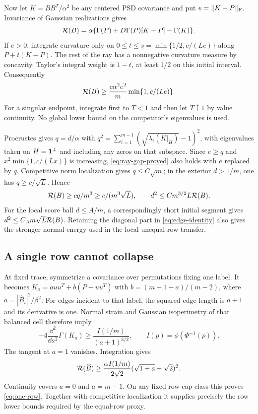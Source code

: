 Now let $K=BB^T/\alpha^2$ be any centered PSD covariance and put
$e=\|K-P\|_\mathrm F$. Invariance of Gaussian realizations gives
\[
 \mathcal R(B)=\alpha\{\Gamma(P)+D\Gamma(P)[K-P]-\Gamma(K)\}.
\]
If $e>0$, integrate curvature only on
$0\le t\le s=\min\{1/2,c/(Le)\}$ along $P+t(K-P)$.
The rest of the ray has a nonnegative curvature measure by concavity.
Taylor's integral weight is $1-t$, at least $1/2$ on this initial interval.
Consequently
\begin{equation}\label{eq:ray-gap-proved}
 \mathcal R(B)\ge\frac{c\alpha^2e^2}{m}
                      \min\{1,c/(Le)\}.
\end{equation}
For a singular endpoint, integrate first to $T<1$ and then let
$T\uparrow1$ by value continuity. No global lower bound on the
competitor's eigenvalues is used.

Procrustes gives $q=d/\alpha$ with
$q^2=\sum_{i=1}^{m-1}(\sqrt{\lambda_i(K|_H)}-1)^2$, with eigenvalues
taken on $H=\mathbf 1^\perp$ and including any zeros on that subspace.
Since $e\ge q$ and $x^2\min\{1,c/(Lx)\}$ is increasing,
\eqref{eq:ray-gap-proved} also holds with $e$ replaced by $q$.
Competitive norm localization gives $q\le C\sqrt m$; in the exterior
$d>1/m$, one has $q\ge c/\sqrt L$. Hence
\begin{equation}\label{eq:ray-exterior-proved}
 \mathcal R(B)\ge cq/m^3\ge c/(m^3\sqrt L),\qquad
 d^2\le Cm^{3/2}L\mathcal R(B).
\end{equation}
For the local score ball $d\le A/m$, a correspondingly short initial
segment gives $d^2\le C_A m\sqrt L\mathcal R(B)$. Retaining the diagonal
part in \eqref{eq:edge-identity} also gives the stronger normal energy
used in the local unequal-row transfer.

\subsection{A single row cannot collapse}
At fixed trace, symmetrize a covariance over permutations fixing one label.
It becomes $K_a=a uu^T+b(P-uu^T)$ with
$b=(m-1-a)/(m-2)$, where $a=|\widehat B_i|^2/\beta^2$.
For edges incident to that label, the squared edge length is $a+1$ and
its derivative is one. Normal strain and Gaussian isoperimetry of that
balanced cell therefore imply
\[
 -4\frac{\dd^2}{\dd a^2}\Gamma(K_a)
       \ge\frac{I(1/m)}{(a+1)^{3/2}},\qquad
 I(p)=\phi(\Phi^{-1}(p)).
\]
The tangent at $a=1$ vanishes. Integration gives
\[
 \mathcal R(\widehat B)\ge\frac{\alpha I(1/m)}{2\sqrt2}
                    (\sqrt{1+a}-\sqrt2)^2.
\]
Continuity covers $a=0$ and $a=m-1$. On any fixed row-cap class this
proves \eqref{eq:one-row}. Together with competitive localization it
supplies precisely the row lower bounds required by the equal-row proxy.
